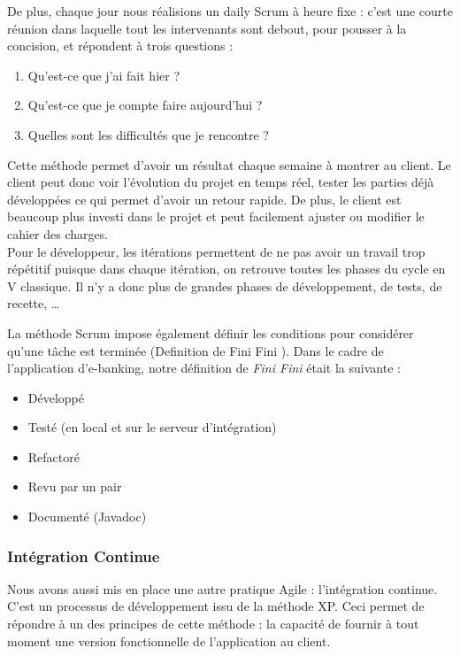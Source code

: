 De plus, chaque jour nous réalisions un \flqq{}daily Scrum\frqq{} à heure fixe : c'est une courte réunion dans laquelle tout les intervenants sont debout, pour pousser à la concision, et répondent à trois questions :
\begin{enumerate}
	\item Qu'est-ce que j'ai fait hier ?
	
	\item Qu'est-ce que je compte faire aujourd'hui ?
	
	\item Quelles sont les difficultés que je rencontre ?\\
\end{enumerate}

Cette méthode permet d'avoir un résultat chaque semaine à montrer au client. Le client peut donc voir l'évolution du projet en temps réel, tester les parties déjà développées ce qui permet d'avoir un retour rapide. De plus, le client est beaucoup plus investi dans le projet et peut facilement ajuster ou modifier le cahier des charges.\\

Pour le développeur, les itérations permettent de ne pas avoir un travail trop répétitif puisque dans chaque itération, on retrouve toutes les phases du cycle en V classique. Il n'y a donc plus de grandes phases de développement, de tests, de recette, \dots{}

La méthode Scrum impose également définir les conditions pour considérer qu'une tâche est terminée (Definition de \og Fini Fini \fg{}). Dans le cadre de l'application d'e-banking, notre définition de \textit{Fini Fini} était la suivante :
\begin{itemize}
	\item Développé
	\item Testé (en local et sur le serveur d'intégration)
	\item Refactoré
	\item Revu par un pair
	\item Documenté (Javadoc)
\end{itemize}

\subsubsection{Intégration Continue}

Nous avons aussi mis en place une autre pratique Agile : l'intégration continue. C'est un processus de développement issu de la méthode XP. Ceci permet de répondre à un des principes de cette méthode : la capacité de fournir à tout moment une version fonctionnelle de l'application au client.

